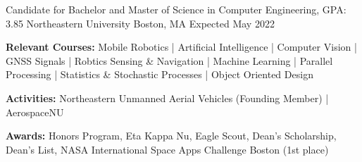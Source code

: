 
\begin{cventries}
  \cventry
    {Candidate for Bachelor and Master of Science in Computer Engineering, GPA: 3.85} %
    {Northeastern University} %
    {Boston, MA} %
    {Expected May 2022} %
    {
      \begin{cvitems} %
         \item {\textbf{Relevant Courses:} Mobile Robotics | Artificial Intelligence | Computer Vision 
         | GNSS Signals | Robtics Sensing \& Navigation | Machine Learning | Parallel Processing | 
         Statistics \& Stochastic Processes | Object Oriented Design}
         \item {\textbf{Activities:} Northeastern Unmanned Aerial Vehicles (Founding Member) | AerospaceNU}
         \item {\textbf{Awards:} Honors Program, Eta Kappa Nu, Eagle Scout, Dean's Scholarship, 
         Dean's List, NASA International Space Apps Challenge Boston (1st place)}
      \end{cvitems}
    }
\end{cventries}
